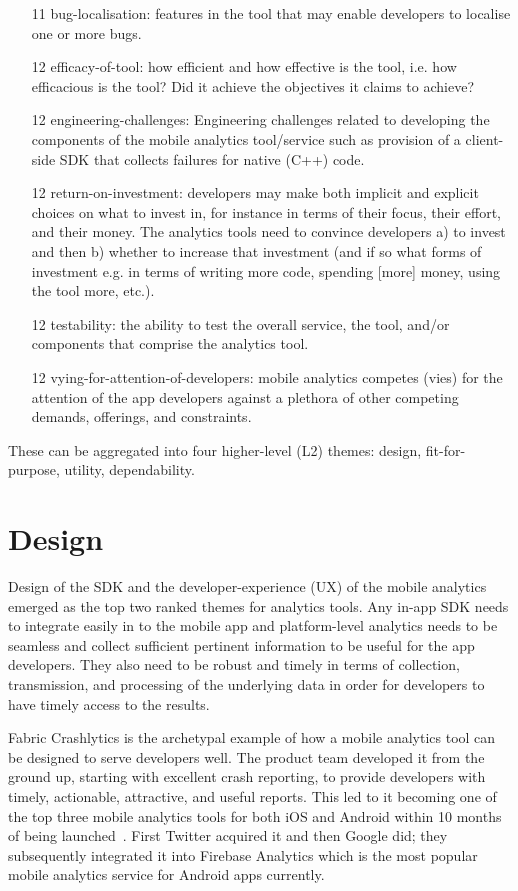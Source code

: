 {\begin{enumerate}
    \item[11] bug-localisation: features in the tool that may enable developers to localise one or more bugs.
    \item[12] efficacy-of-tool: how efficient and how effective is the tool, i.e. how efficacious is the tool? Did it achieve the objectives it claims to achieve?
    \item[12] engineering-challenges: Engineering challenges related to developing the components of the mobile analytics tool/service such as provision of a client-side SDK that collects failures for native (C++) code.
    \item[12] return-on-investment: developers may make both implicit and explicit choices on what to invest in, for instance in terms of their focus, their effort, and their money. The analytics tools need to convince developers a) to invest and then b) whether to increase that investment (and if so what forms of investment e.g. in terms of writing more code, spending [more] money, using the tool more, etc.).
    \item[12] testability: the ability to test the overall service, the tool, and/or components that comprise the analytics tool.
    \item[12] vying-for-attention-of-developers: mobile analytics competes (vies) for the attention of the app developers against a plethora of other competing demands, offerings, and constraints. 
\end{enumerate}
}

These can be aggregated into four higher-level (L2) themes: design, fit-for-purpose, utility, dependability.

\section{Design}
Design of the SDK and the developer-experience (UX) of the mobile analytics emerged as the top two ranked themes for analytics tools. Any in-app SDK needs to integrate easily in to the mobile app and platform-level analytics needs to be seamless and collect sufficient pertinent information to be useful for the app developers. They also need to be robust and timely in terms of collection, transmission, and processing of the underlying data in order for developers to have timely access to the results. 

Fabric Crashlytics is the archetypal example of how a mobile analytics tool can be designed to serve developers well. The product team developed it from the ground up, starting with excellent crash reporting, to provide developers with timely, actionable, attractive, and useful reports. This led to it becoming one of the top three mobile analytics tools for both iOS and Android within 10 months of being launched~\citep{___answersblog_2015_may_crashlytics-no1-in-performance}. %
First Twitter acquired it and then Google did; they subsequently integrated it into Firebase Analytics which is the most popular mobile analytics service for Android apps currently.


